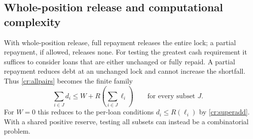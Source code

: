 \subsection{Whole-position release and computational complexity}\label{cr:complexity}

With whole-position release, full repayment releases the entire lock; a partial repayment, if allowed, releases none. For testing the greatest cash requirement it suffices to consider loans that are either unchanged or fully repaid. A partial repayment reduces debt at an unchanged lock and cannot increase the shortfall. Thus \cref{cr:allpairs} becomes the finite family
\begin{equation}\label{cr:subsets}
\sum_{i\in J}d_i\le W+R\!\left(\sum_{i\in J}\ell_i\right)
\qquad\text{for every subset }J.
\end{equation}
For $W=0$ this reduces to the per-loan conditions $d_i\le R(\ell_i)$ by \eqref{cr:superadd}. With a shared positive reserve, testing all subsets can instead be a combinatorial problem.

